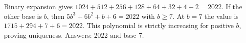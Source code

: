 Binary expansion gives $1024+512+256+128+64+32+4+2=2022$. If the other base is $b$, then $5b^3+6b^2+b+6=2022$ with $b\ge7$. At $b=7$ the value is $1715+294+7+6=2022$. This polynomial is strictly increasing for positive $b$, proving uniqueness. Answers: $\boxed{2022\text{ and base }7}$.
